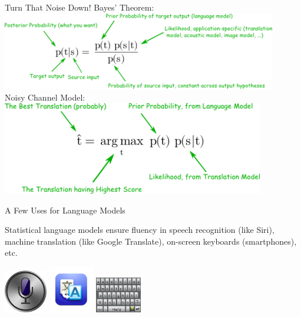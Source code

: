 \documentclass[xcolor=pdftex,x11names,table,hyperref]{beamer}
\begin{document}
\begin{frame}{Turn That Noise Down!}
	Bayes' Theorem: \\[0.5em]
	\includegraphics[width=0.90\textwidth]{images/bayes_theorem.png} \\[1.0em]
	\pause
	Noisy Channel Model: \\[0.5em]
	\includegraphics[width=0.86\textwidth]{images/noisy_channel.png}
\end{frame}


\begin{frame}{A Few Uses for Language Models}
 \begin{block}{}
	 Statistical language models ensure fluency in speech recognition (like Siri), machine translation (like Google Translate), on-screen keyboards (smartphones), etc.
 \end{block}
\begin{center}
	\includegraphics[width=0.14\textwidth]{images/siri.jpg} \hspace{2em}
	\includegraphics[width=0.15\textwidth]{images/google-translate.jpg} \hspace{2em}
	\includegraphics[width=0.15\textwidth]{images/navajo-android-keyboard-crop.png}\\[.1ex]
\end{center}
\end{frame}
\end{document}

